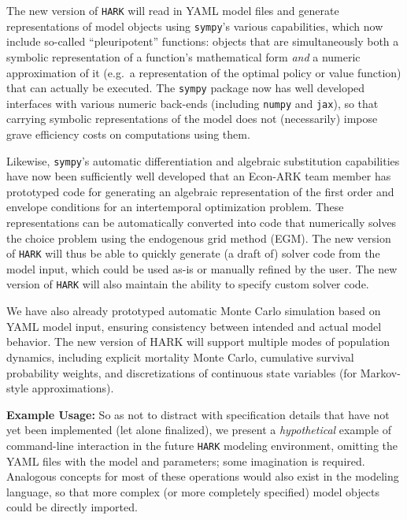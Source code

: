 \documentclass[12pt,pdftex,letterpaper]{article}
\begin{document}
The new version of \texttt{HARK} will read in YAML model files and generate representations of model objects using \texttt{sympy}'s various capabilities, which now include so-called ``pleuripotent'' functions: objects that are simultaneously both a symbolic representation of a function's mathematical form \textit{and} a numeric approximation of it (e.g.\ a representation of the optimal policy or value function) that can actually be executed. The \texttt{sympy} package now has well developed interfaces with various numeric back-ends (including \texttt{numpy} and \texttt{jax}), so that carrying symbolic representations of the model does not (necessarily) impose grave efficiency costs on computations using them.

Likewise, \texttt{sympy}'s automatic differentiation and algebraic substitution capabilities have now been sufficiently well developed that an Econ-ARK team member has prototyped code for generating an algebraic representation of the first order and envelope conditions for an intertemporal optimization problem. These representations can be automatically converted into code that numerically solves the choice problem using the endogenous grid method (EGM). The new version of \texttt{HARK} will thus be able to quickly generate (a draft of) solver code from the model input, which could be used as-is or manually refined by the user. The new version of \texttt{HARK} will also maintain the ability to specify custom solver code.

We have also already prototyped automatic Monte Carlo simulation based on YAML model input, ensuring consistency between intended and actual model behavior. The new version of HARK will support multiple modes of population dynamics, including explicit mortality Monte Carlo, cumulative survival probability weights, and discretizations of continuous state variables (for Markov-style approximations).

\vspace{0.35cm}

\noindent \textbf{Example Usage:} So as not to distract with specification details that have not yet been implemented (let alone finalized), we present a \textit{hypothetical} example of command-line interaction in the future \texttt{HARK} modeling environment, omitting the YAML files with the model and parameters; some imagination is required. Analogous concepts for most of these operations would also exist in the modeling language, so that more complex (or more completely specified) model objects could be directly imported.
\end{document}
